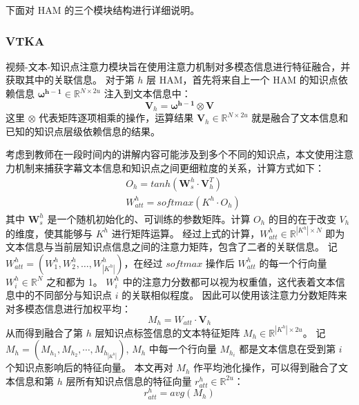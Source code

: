     下面对 HAM 的三个模块结构进行详细说明。

    \subsubsection{VTKA}
    视频-文本-知识点注意力模块旨在使用注意力机制对多模态信息进行特征融合，并获取其中的关联信息。
    对于第 $h$ 层 HAM，首先将来自上一个 HAM 的知识点依赖信息 $\boldsymbol{\omega^{h - 1}} \in \mathbb{R}^{N \times 2u}$ 注入到文本信息中：
    \begin{equation}
        \boldsymbol{V}_h = \boldsymbol{\omega^{h - 1}} \otimes \boldsymbol{V}
    \end{equation}
    这里 $\otimes$ 代表矩阵逐项相乘的操作，运算结果 $\boldsymbol{V}_h \in \mathbb{R}^{N \times 2u}$ 就是融合了文本信息和已知的知识点层级依赖信息的结果。

    考虑到教师在一段时间内的讲解内容可能涉及到多个不同的知识点，本文使用注意力机制来捕获字幕文本信息和知识点之间更细粒度的关系，计算方式如下：
    \begin{equation}
        \begin{aligned}
            &O_h = tanh\left(\boldsymbol{W}_s^h \cdot \boldsymbol{V}_h^T\right) \\
            &W_{att}^h = softmax\left(K^h \cdot O_h\right)
        \end{aligned}
    \end{equation}
    其中 $\boldsymbol{W}_s^h$ 是一个随机初始化的、可训练的参数矩阵。计算 $O_h$ 的目的在于改变 $V_h$ 的维度，使其能够与 $K^h$ 进行矩阵运算。
    经过上式的计算，$W_{att}^h \in \mathbb{R}^{\left|K^h\right| \times N}$ 即为文本信息与当前层知识点信息之间的注意力矩阵，包含了二者的关联信息。
    记 $W_{att}^h = \left(W_1^h, W_2^h, \dots, W_{\left|K^h\right|}^h\right)$，在经过 $softmax$ 操作后 $W_{att}^h$ 的每一个行向量 $W_i^h \in \mathbb{R}^N$ 之和都为 1。
    $W_i^h$ 中的注意力分数都可以视为权重值，这代表着文本信息中的不同部分与知识点 $i$ 的关联相似程度。
    因此可以使用该注意力分数矩阵来对多模态信息进行加权平均：
    \begin{equation}
        M_h = W_{att} \cdot \boldsymbol{V}_h
    \end{equation}
    从而得到融合了第 $h$ 层知识点标签信息的文本特征矩阵 $M_h \in \mathbb{R}^{{\left|K^h\right|} \times 2u}$。
    记 $M_h = \left(M_{h_1}, M_{h_2}, \cdots, M_{h_{\left|K^h\right|}}\right)$, $M_h$ 中每一个行向量 $M_{h_i}$ 都是文本信息在受到第 $i$ 个知识点影响后的特征向量。
    本文再对 $M_h$ 作平均池化操作，可以得到融合了文本信息和第 $h$ 层所有知识点信息的特征向量 $r_{att}^h \in \mathbb{R}^{2u}$：
    \begin{equation}
        r_{att}^h = avg\left(M_h\right)
    \end{equation}

